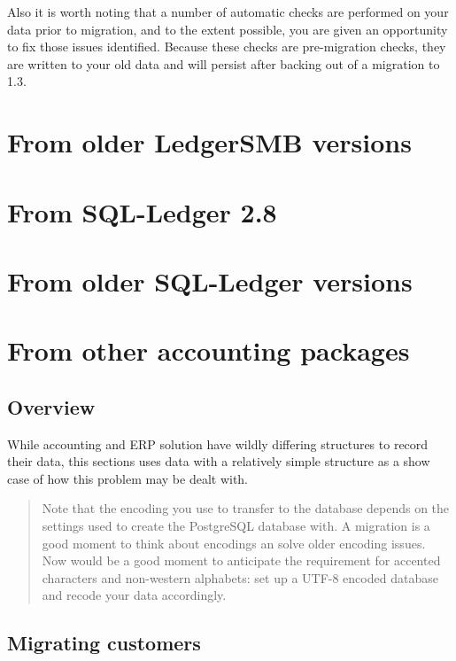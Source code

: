 Also it is worth noting that a number of automatic checks are performed on your
data prior to migration, and to the extent possible, you are given an
opportunity to fix those issues identified.  Because these checks are
pre-migration checks, they are written to your old data and will persist after
backing out of a migration to 1.3.

\section{From older LedgerSMB versions}
\label{sec-migration-from-older-ledgersmb}

\section{From SQL-Ledger 2.8}
\label{sec-migration-from-sql-ledger-28}

\section{From older SQL-Ledger versions}
\label{sec-migration-from-older-sql-ledger}

\section{From other accounting packages}
\label{sec-migration-from-other-accounting-systems}

\subsection{Overview}





While accounting and ERP solution have wildly differing structures to record their
data, this sections uses data with a relatively simple structure as a show case of
how this problem may be dealt with.

\begin{quote}
Note that the encoding you use to transfer to the database depends on the settings
used to create the PostgreSQL database with.  A migration is a good moment to think
about encodings an solve older encoding issues.  Now would be a good moment to
anticipate the requirement for accented characters and non-western alphabets: set up
a UTF-8 encoded database and recode your data accordingly.
\end{quote}

\subsection{Migrating customers}
\label{subsec-migration-others-customers}

